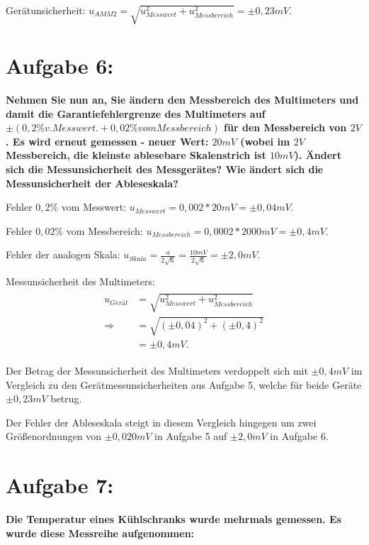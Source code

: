 \documentclass[
]{article}
\begin{document}
Gerätunsicherheit:
\(u_{AMM2} = \sqrt{u_{Messwert}^2+u_{Messbereich}^2} = \pm0,23 mV\).

\hypertarget{aufgabe-6}{%
\section{Aufgabe 6:}\label{aufgabe-6}}

\textbf{Nehmen Sie nun an, Sie ändern den Messbereich des Multimeters und damit die Garantiefehlergrenze des Multimeters auf \(\pm(0,2\% v. Messwert. + 0,02\% vom Messbereich)\) für den Messbereich von \(2 V\). 
Es wird erneut gemessen - neuer Wert: \(20 mV\) (wobei im \(2V\) Messbereich, die kleinste ablesebare Skalenstrich ist \(10mV\)).
Ändert sich die Messunsicherheit des Messgerätes? 
Wie ändert sich die Messunsicherheit der Ableseskala?}

Fehler \(0,2\%\) vom Messwert:
\(u_{Messwert} = 0,002 * 20mV = \pm 0,04mV\).

Fehler \(0,02\%\) vom Messbereich:
\(u_{Messbereich} = 0,0002 * 2000mV = \pm0,4mV\).

Fehler der analogen Skala:
\(u_{Skala} = \frac{a}{2\sqrt{6}} = \frac{10mV}{2\sqrt{6}}=\pm2,0mV\).

Messunsicherheit des Multimeters: 
\begin{align*}
	\begin{split}
    	u_{Gerät} &= \sqrt{u_{Messwert}^2+u_{Messbereich}^2}\\
    	\Rightarrow  &= \sqrt{(\pm 0,04)^2+(\pm 0,4)^2}\\
        &= \pm 0,4mV.
  \end{split}
\end{align*}

Der Betrag der Messunsicherheit des Multimeters verdoppelt sich mit \(\pm 0,4mV\) im Vergleich zu den Gerätmessunsicherheiten aus Aufgabe 5, welche für beide Geräte \(\pm 0,23mV\) betrug.

Der Fehler der Ableseskala steigt in diesem Vergleich hingegen um zwei
Größenordnungen von \(\pm 0,020mV\) in Aufgabe 5 auf \(\pm 2,0mV\) in
Aufgabe 6.

\hypertarget{aufgabe-7}{%
\section{Aufgabe 7:}\label{aufgabe-7}}

\textbf{Die Temperatur eines Kühlschranks wurde mehrmals gemessen. 
Es wurde diese Messreihe aufgenommen:}
\end{document}
